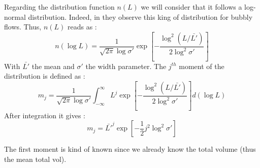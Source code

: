\documentclass[10pt,a4paper,openany]{article}
\theoremstyle{mytheoremstyle}
\theoremstyle{mytheoremstyle}
\theoremstyle{myproblemstyle}
\begin{document}
Regarding the distribution function $n(L)$ we will consider that it follows a log-normal distribution. 
Indeed, in \citet{KAMP20011363} they observe this king of distribution for bubbly flows. 
Thus, $n(L)$ reads as : 
\begin{equation}
    n(\log L) = \frac{1}{\sqrt{2\pi}\log{\sigma'}}  \exp\left[{-\frac{\log^2(L/\bar{L'})}{2\log^2{\sigma'}}}\right]
\end{equation}
With $\bar{L'}$ the mean and $\sigma'$ the width parameter. 
The $j^{th}$ moment of the distribution is defined as :
\begin{equation}
    m_j= \frac{1}{\sqrt{2\pi}\log{\sigma'}} \int_ {-\infty}^\infty L^j\exp\left[{-\frac{\log^2(L/\bar{L'})}{2\log^2{\sigma'}}}\right]d(\log L)
\end{equation}
After integration it gives :
\begin{equation}
    m_j= \bar{L'}^j\exp\left[-\frac{1}{2}j^2\log^2\sigma'\right]
\end{equation}

The first moment is kind of known since we already know the total volume (thus the mean total vol).

\appendix
{}
\end{document}
